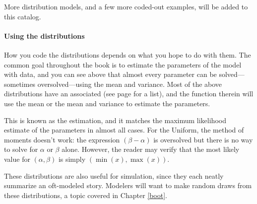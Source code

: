 More distribution models, and a few more coded-out examples, will be added to this catalog.

\paragraph{Using the distributions} How you code the distributions
depends on what you hope to do with them. The common goal throughout the
book is to estimate the parameters of the model with data, and you can
see above that almost every parameter can be solved---sometimes
oversolved---using the mean and variance. Most of the above distributions
have an  associated (see page \pageref{modellist} for a
list), and the  function therein will use the mean or the
mean and variance to estimate the parameters.

This is known as the  estimation, and it
matches the maximum likelihood estimate of the parameters in almost all
cases. For the Uniform, the method of moments doesn't work: the
expression $(\beta - \alpha)$ is oversolved but there is no way to solve
for $\alpha$ or $\beta$ alone. However, the reader may verify that the
most likely value for $(\alpha, \beta)$ is simply $(\min(x), \max(x))$.

These distributions are also useful for simulation, since they each
neatly summarize an oft-modeled story. Modelers will want to make random
draws from these distributions, a topic covered in Chapter \ref{boot}.


